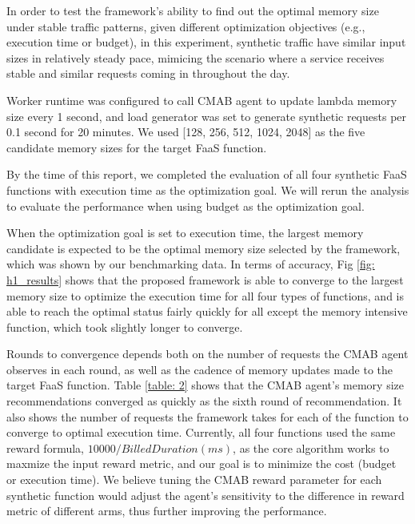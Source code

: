 \documentclass[conference]{IEEEtran}
\begin{document}
In order to test the framework's ability to find out the optimal memory size under stable traffic patterns, given different optimization objectives (e.g., execution time or budget), in this experiment, synthetic traffic have similar input sizes in relatively steady pace, mimicing the scenario where a service receives stable and similar requests coming in throughout the day.

Worker runtime was configured to call CMAB agent to update lambda memory size every 1 second, and load generator was set to generate synthetic requests per 0.1 second for 20 minutes. We used [128, 256, 512, 1024, 2048] as the five candidate memory sizes for the target FaaS function.

By the time of this report, we completed the evaluation of all four synthetic FaaS functions with execution time as the optimization goal. We will rerun the analysis to evaluate the performance when using budget as the optimization goal.

When the optimization goal is set to execution time, the largest memory candidate is expected to be the optimal memory size selected by the framework, which was shown by our benchmarking data. In terms of accuracy, Fig \ref{fig: h1_results} shows that the proposed framework is able to converge to the largest memory size to optimize the execution time for all four types of functions, and is able to reach the optimal status fairly quickly for all except the memory intensive function, which took slightly longer to converge.

Rounds to convergence depends both on the number of requests the CMAB agent observes in each round, as well as the cadence of memory updates made to the target FaaS function. Table \ref{table: 2} shows that the CMAB agent's memory size recommendations converged as quickly as the sixth round of recommendation. It also shows the number of requests the framework takes for each of the function to converge to optimal execution time. Currently, all four functions used the same reward formula, $10000/Billed Duration(ms)$, as the core algorithm works to maxmize the input reward metric, and our goal is to minimize the cost (budget or execution time). We believe tuning the CMAB reward parameter for each synthetic function would adjust the agent's sensitivity to the difference in reward metric of different arms, thus further improving the performance.

\end{document}
